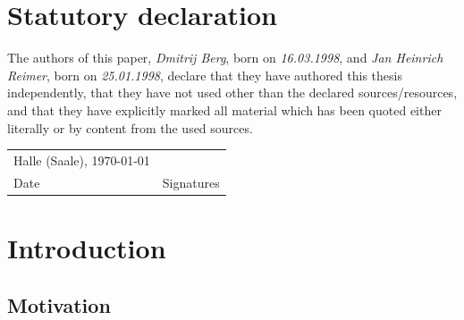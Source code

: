 \documentclass[                                                             %
        12pt,                                                                   %
        twoside                                                                 %
    ]{scrartcl}                                                                 %
\begin{document}
\section*{Statutory declaration}

The authors of this paper, 
\emph{Dmitrij Berg}, born on \emph{16.03.1998}, and  
\emph{Jan Heinrich Reimer}, born on \emph{25.01.1998}, 
declare that they have authored this thesis independently, 
that they have not used other than the declared sources/resources, 
and that they have explicitly marked all material which has been quoted 
either literally or by content from the used sources. \\

{%
    \vspace*{0.5cm}%
    \noindent%
    \setlength{\tabcolsep}{0pt}%
    \begin{tabu} to 
       	Halle (Saale), \today \hspace{0.5cm} &                            \\
       	 
       	{\footnotesize Date}                 & {\footnotesize Signatures}
    \end{tabu}
}
\clearpage

\tableofcontents
\clearpage

\section{Introduction}

\subsection{Motivation}
\end{document}
